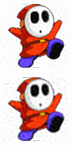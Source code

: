\pagebreak
{}
\begin{figure}
  \centering
  \begin{subfigure}[b]{0.24\textwidth}
    \centering
    \includegraphics[width=\textwidth]{plaatjes/shyguy_fourier_0_1.png}
  \end{subfigure}
  \begin{subfigure}[b]{0.24\textwidth}
    \centering
    \includegraphics[width=\textwidth]{plaatjes/shyguy_fourier_0_05.png}

\end{subfigure}
\end{figure}
